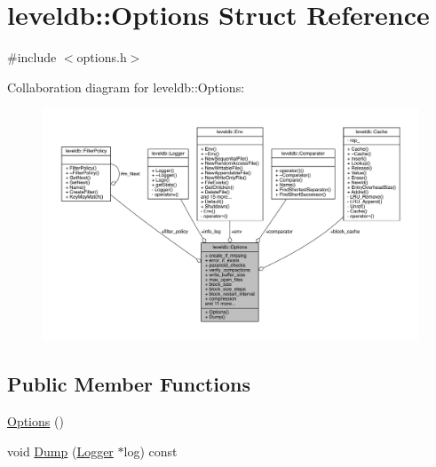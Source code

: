 \hypertarget{structleveldb_1_1_options}{}\section{leveldb\+:\+:Options Struct Reference}
\label{structleveldb_1_1_options}


{\ttfamily \#include $<$options.\+h$>$}



Collaboration diagram for leveldb\+:\+:Options\+:
\nopagebreak
\begin{figure}[H]
\begin{center}
\leavevmode
\includegraphics[width=350pt]{structleveldb_1_1_options__coll__graph}
\end{center}
\end{figure}
\subsection*{Public Member Functions}
\begin{DoxyCompactItemize}
\item 
\hyperlink{structleveldb_1_1_options_a52d77c894795ba83077045daeab3d581}{Options} ()
\item 
void \hyperlink{structleveldb_1_1_options_a026f9b0658bf83c358ea3c990073c00d}{Dump} (\hyperlink{classleveldb_1_1_logger}{Logger} $\ast$log) const 
\end{DoxyCompactItemize}

